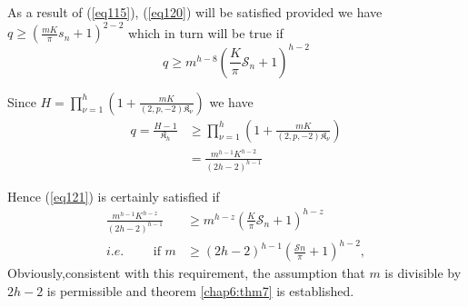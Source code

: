 As a result of (\ref{eq115}), (\ref{eq120}) will be satisfied provided
we have $ q 
\geq ( \frac{m K}{\pi} s_n +1)^{2-2}$ which in turn will be true if  
\begin{equation*}
q \geq m^{h-8}( \frac{K}{\pi}\mathscr{S}_n +1)^{h-2} \tag{121}\label{eq121} 
\end{equation*}

Since $H = \prod \limits^h_{\nu =1}( 1+ \frac{mK}{(2,p, -2)
  \mathfrak{K}_{\nu}})$ we have  
\begin{align*}
q = \frac{H-1}{\mathfrak{K}_h} & \geq \prod \limits^h_{\nu =1}( 1+
\frac{mK}{(2,p, -2) \mathfrak{K}_{\nu}})\\ 
& = \frac{m^{h-1} K^{h-2}}{(2 h - 2 )^{h-1}}
\end{align*}

Hence (\ref{eq121}) is certainly satisfied if 
\begin{align*}
\frac{m^{h-1} K^{h-z}}{(2 h - 2)^{h-1}} & \ge m^{h-z} (\frac{K}{\pi}
\mathscr{S}_n + 1)^{h-z} \\ 
i.e. \qquad \text{ if } m & \ge (2h - 2)^{h-1}
(\frac{\mathscr{S}n}{\pi} + 1)^{h-2}, 
\end{align*} 
Obviously,\pageoriginale consistent with this requirement, the
assumption that $m$ is divisible by $2 h - 2$ is permissible and
theorem \ref{chap6:thm7} is established.  

 
